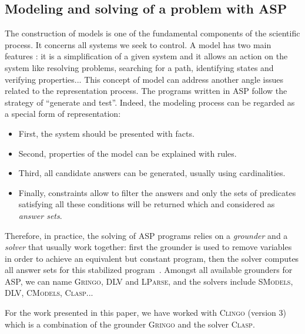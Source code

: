 \subsection*{Modeling and solving of a problem with ASP}

The construction of models is one of the fundamental components of the scientific process.
It concerns all systems we seek to control.
A model has two main features \cite{Glimpse}:
it is a simplification of a given system
and it allows an action on the system like resolving problems, searching for a path, identifying states and verifying properties...
This concept of model can address another angle issues related to the representation process.
The programs written in ASP follow the strategy of ``generate and test''.
Indeed, the modeling process can be regarded as a special form of representation:
\begin{itemize}
  \item First, the system should be presented with facts.
  \item Second, properties of the model can be explained with rules.
  \item Third, all candidate answers can be generated, usually using cardinalities.
  \item Finally, constraints allow to filter the answers and only the sets of predicates satisfying all these conditions will be returned which and considered as \emph{answer sets}.
\end{itemize}

Therefore, in practice, the solving of ASP programs relies on a \emph{grounder} and a \emph{solver}
that usually work together:
first the grounder is used to remove variables in order to achieve an equivalent but constant program,
then the solver computes all answer sets for this stabilized program~\cite{Vladimir,AnsPrologAPE}.
Amongst all available grounders for ASP, we can name
\textsc{Gringo}, \textsc{DLV} and \textsc{LParse},
and the solvers include
\textsc{SModels}, \textsc{DLV}, \textsc{CModels}, \textsc{Clasp}...

For the work presented in this paper, we have worked with \textsc{Clingo} (version 3) which is a combination of the grounder \textsc{Gringo} and the solver \textsc{Clasp}.


